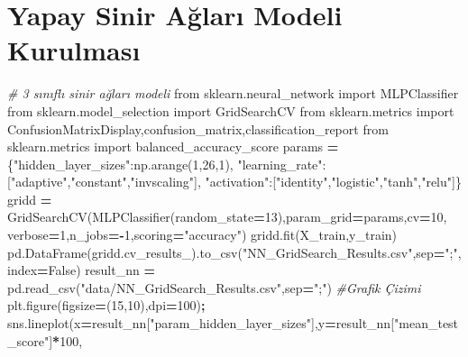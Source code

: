 \documentclass[12pt,twoside]{deuthesis}
\newenvironment{Shaded}{\begin{snugshade}}{\end{snugshade}}
\newcommand{\CommentTok}[1]{\textcolor[rgb]{0.56,0.35,0.01}{\textit{#1}}}
\newcommand{\DecValTok}[1]{\textcolor[rgb]{0.00,0.00,0.81}{#1}}
\newcommand{\ImportTok}[1]{#1}
\newcommand{\NormalTok}[1]{#1}
\newcommand{\OperatorTok}[1]{\textcolor[rgb]{0.81,0.36,0.00}{\textbf{#1}}}
\newcommand{\StringTok}[1]{\textcolor[rgb]{0.31,0.60,0.02}{#1}}
\newcommand{\VariableTok}[1]{\textcolor[rgb]{0.00,0.00,0.00}{#1}}
\begin{document}
\hypertarget{yapay-sinir-aux11flarux131-modeli-kurulmasux131}{%
\section{Yapay Sinir Ağları Modeli Kurulması}\label{yapay-sinir-aux11flarux131-modeli-kurulmasux131}}

\scriptsize
\begin{Shaded}
\begin{Highlighting}[]
\CommentTok{\# 3 sınıflı sinir ağları modeli}
\ImportTok{from}\NormalTok{ sklearn.neural\_network }\ImportTok{import}\NormalTok{ MLPClassifier}
\ImportTok{from}\NormalTok{ sklearn.model\_selection }\ImportTok{import}\NormalTok{ GridSearchCV}
\ImportTok{from}\NormalTok{ sklearn.metrics }\ImportTok{import}\NormalTok{ ConfusionMatrixDisplay,confusion\_matrix,classification\_report}
\ImportTok{from}\NormalTok{ sklearn.metrics }\ImportTok{import}\NormalTok{ balanced\_accuracy\_score}
\NormalTok{params }\OperatorTok{=}\NormalTok{ \{}\StringTok{"hidden\_layer\_sizes"}\NormalTok{:np.arange(}\DecValTok{1}\NormalTok{,}\DecValTok{26}\NormalTok{,}\DecValTok{1}\NormalTok{),}
          \StringTok{"learning\_rate"}\NormalTok{:[}\StringTok{"adaptive"}\NormalTok{,}\StringTok{"constant"}\NormalTok{,}\StringTok{"invscaling"}\NormalTok{],}
          \StringTok{"activation"}\NormalTok{:[}\StringTok{"identity"}\NormalTok{,}\StringTok{"logistic"}\NormalTok{,}\StringTok{"tanh"}\NormalTok{,}\StringTok{"relu"}\NormalTok{]\}}
\NormalTok{gridd }\OperatorTok{=}\NormalTok{ GridSearchCV(MLPClassifier(random\_state}\OperatorTok{=}\DecValTok{13}\NormalTok{),param\_grid}\OperatorTok{=}\NormalTok{params,cv}\OperatorTok{=}\DecValTok{10}\NormalTok{,}
\NormalTok{                                   verbose}\OperatorTok{=}\DecValTok{1}\NormalTok{,n\_jobs}\OperatorTok{={-}}\DecValTok{1}\NormalTok{,scoring}\OperatorTok{=}\StringTok{"accuracy"}\NormalTok{)}
\NormalTok{gridd.fit(X\_train,y\_train)                                  }
\NormalTok{pd.DataFrame(gridd.cv\_results\_).to\_csv(}\StringTok{"NN\_GridSearch\_Results.csv"}\NormalTok{,sep}\OperatorTok{=}\StringTok{";"}\NormalTok{,index}\OperatorTok{=}\VariableTok{False}\NormalTok{)}
\NormalTok{result\_nn }\OperatorTok{=}\NormalTok{ pd.read\_csv(}\StringTok{"data/NN\_GridSearch\_Results.csv"}\NormalTok{,sep}\OperatorTok{=}\StringTok{";"}\NormalTok{)}
\CommentTok{\#Grafik Çizimi}
\NormalTok{plt.figure(figsize}\OperatorTok{=}\NormalTok{(}\DecValTok{15}\NormalTok{,}\DecValTok{10}\NormalTok{),dpi}\OperatorTok{=}\DecValTok{100}\NormalTok{)}\OperatorTok{;}
\NormalTok{sns.lineplot(x}\OperatorTok{=}\NormalTok{result\_nn[}\StringTok{"param\_hidden\_layer\_sizes"}\NormalTok{],y}\OperatorTok{=}\NormalTok{result\_nn[}\StringTok{"mean\_test\_score"}\NormalTok{]}\OperatorTok{*}\DecValTok{100}\NormalTok{,}

\end{Highlighting}
\end{Shaded}
\end{document}
